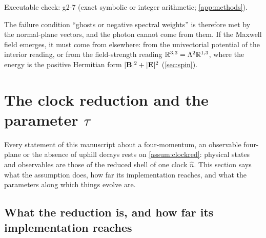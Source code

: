 \noindent Executable check: g2-7 (exact symbolic or integer arithmetic; \cref{app:methods}).

The failure condition ``ghosts or negative spectral weights'' is therefore met by the normal-plane vectors, and the photon cannot come from them. If the Maxwell field
emerges, it must come from elsewhere: from the univectorial potential of the interior reading, or from the field-strength reading $\mathbb{R}^{3,3}=\Lambda^2\mathbb{R}^{1,3}$, where the
energy is the positive Hermitian form $|\mathbf B|^2+|\mathbf E|^2$ (\cref{sec:spin}).

\section{The clock reduction and the parameter \texorpdfstring{$\tau$}{tau}}
\label{sec:tau}

Every statement of this manuscript about a four-momentum, an observable four-plane or the absence of uphill decays rests on
\cref{assum:clockred}: physical states and observables are those of the reduced shell of one clock $\hat n$. This section says what the
assumption does, how far its implementation reaches, and what the parameters along which things evolve are.

\subsection{What the reduction is, and how far its implementation reaches}

